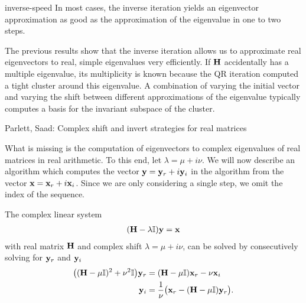 \begin{Corollary}{inverse-speed}
  In most cases, the inverse iteration yields an eigenvector
  approximation as good as the approximation of the eigenvalue in one
  to two steps.
\end{Corollary}

\begin{remark}
  The previous results show that the inverse iteration allows us to
  approximate real eigenvectors to real, simple eigenvalues very
  efficiently. If $\mathbf H$ accidentally has a multiple eigenvalue, its
  multiplicity is known because the QR iteration computed a tight
  cluster around this eigenvalue. A combination of varying the initial
  vector and varying the shift between different approximations of the
  eigenvalue typically computes a basis for the invariant subspace of
  the cluster.
\end{remark}

\begin{todo}
  Parlett, Saad: Complex shift and invert strategies for real matrices
\end{todo}

\begin{intro}
  What is missing is the computation of eigenvectors to complex
  eigenvalues of real matrices in real arithmetic. To this end, let
  $\lambda = \mu+i\nu$. We will now describe an algorithm which
  computes the vector $\mathbf y = \mathbf y_r + i \mathbf y_i$ in the algorithm from
  the vector $\mathbf x = \mathbf x_r+i\mathbf x_i$. Since we are only considering a
  single step, we omit the index of the sequence.
\end{intro}

\begin{Lemma}
  The complex linear system
  \begin{gather}
    (\mathbf H - \lambda\mathbb I) \mathbf y = \mathbf x
  \end{gather}
  with real matrix $\mathbf H$ and complex shift $\lambda = \mu+i\nu$, can
  be solved by consecutively solving for $\mathbf y_r$ and $\mathbf y_i$
  \begin{align}
    \bigl((\mathbf H-\mu\mathbb I)^2+\nu^2\mathbb I\bigr) \mathbf y_r
    &= (\mathbf H-\mu\mathbb I) \mathbf x_r - \nu \mathbf x_i\\
    \mathbf y_i &= \frac1\nu \bigl(\mathbf x_r - (\mathbf H-\mu\mathbb I)\mathbf y_r\bigr).
  \end{align}
\end{Lemma}


